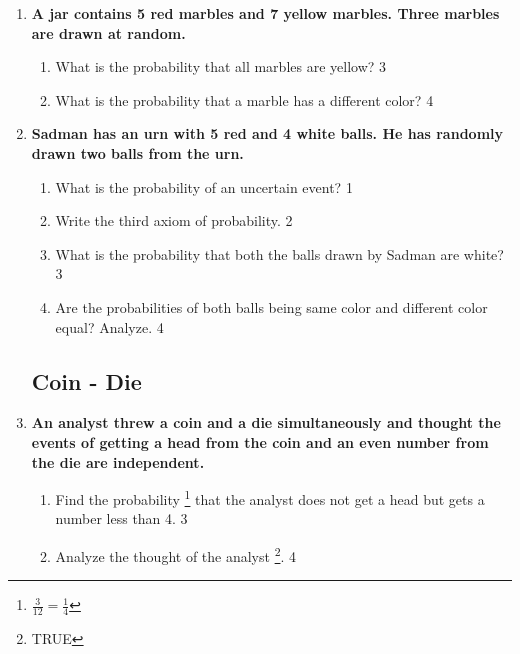\documentclass[a4paper,oneside]{book}
\begin{document}
\begin{enumerate}
  \begin{enumerate}
    \item
	What is the value of $^nC_r$? \hfill 1
    \item
	Illustrate the difference between permutation and combination with an example. \hfill 2
    \item  
	What is the probability that all balls are green? \hfill 3
    \item
	What is the probabilith that one ball has a different color? \hfill 4
  \end{enumerate}
  
  \item
	  \textbf{A jar contains 5 red marbles and 7 yellow marbles. 
	  Three marbles are drawn at random.} 
  
  \begin{enumerate}
    \item  
	What is the probability that all marbles are yellow? \hfill 3
    \item
	What is the probability that a marble has a different color? \hfill 4
  \end{enumerate}


\item
	  \textbf{Sadman has an urn with 5 red and 4 white balls. He has randomly drawn two balls from the urn.} 
  
  \begin{enumerate}
    \item
	What is the probability of an uncertain event? \hfill 1
    \item
	Write the third axiom of probability. \hfill 2
    \item  
	What is the probability that both the balls drawn by Sadman are white? \hfill 3
    \item
	Are the probabilities of both balls being same color and different color equal? Analyze. \hfill 4
  \end{enumerate}
  
  \subsection{Coin - Die}
  
   \item
	  \textbf{An analyst threw a coin and a die simultaneously and thought the events of getting a head from the coin and an even number from the die are independent.} 
  
  \begin{enumerate}
    \item  
	Find the probability \footnote{$\frac{3}{12} = \frac14$} that the analyst does not get a head but gets a number less than 4. \hfill 3
    \item
	Analyze the thought of the analyst \footnote{TRUE}. \hfill 4
  \end{enumerate}


\end{enumerate}
\end{document}
